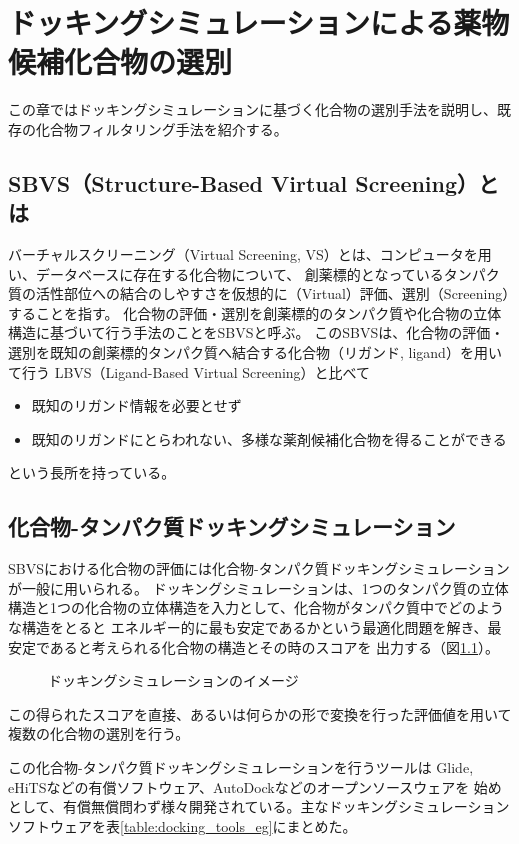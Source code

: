 \chapter{ドッキングシミュレーションによる薬物候補化合物の選別}
この章ではドッキングシミュレーションに基づく化合物の選別手法を説明し、既存の化合物フィルタリング手法を紹介する。

\section{SBVS（Structure-Based Virtual Screening）とは}
バーチャルスクリーニング（Virtual Screening, VS）とは、コンピュータを用い、データベースに存在する化合物について、
創薬標的となっているタンパク質の活性部位への結合のしやすさを仮想的に（Virtual）評価、選別（Screening）することを指す。
化合物の評価・選別を創薬標的のタンパク質や化合物の立体構造に基づいて行う手法のことをSBVSと呼ぶ。
このSBVSは、化合物の評価・選別を既知の創薬標的タンパク質へ結合する化合物（リガンド, ligand）を用いて行う
LBVS（Ligand-Based Virtual Screening）と比べて
\begin{itemize}
\item 既知のリガンド情報を必要とせず
\item 既知のリガンドにとらわれない、多様な薬剤候補化合物を得ることができる
\end{itemize}
という長所を持っている。

\section{化合物-タンパク質ドッキングシミュレーション}
SBVSにおける化合物の評価には化合物-タンパク質ドッキングシミュレーションが一般に用いられる。
ドッキングシミュレーションは、1つのタンパク質の立体構造と1つの化合物の立体構造を入力として、化合物がタンパク質中でどのような構造をとると
エネルギー的に最も安定であるかという最適化問題を解き、最安定であると考えられる化合物の構造とその時のスコアを
出力する（図\ref{fig:docking}）。
\begin{figure}[tb]
 \begin{center}
  \caption{ドッキングシミュレーションのイメージ}
  \label{fig:docking}
 \end{center}
\end{figure}
この得られたスコアを直接、あるいは何らかの形で変換を行った評価値を用いて複数の化合物の選別を行う。

この化合物-タンパク質ドッキングシミュレーションを行うツールは
Glide\cite{Friesner2004}, eHiTS\cite{Zsoldos2007}などの有償ソフトウェア、AutoDock\cite{Morris2009}などのオープンソースウェアを
始めとして、有償無償問わず様々開発されている。主なドッキングシミュレーションソフトウェアを表\ref{table:docking_tools_eg}にまとめた。

